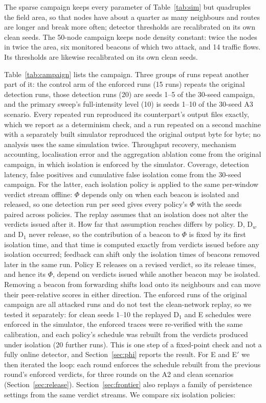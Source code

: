 The sparse campaign keeps every parameter of Table~\ref{tab:sim} but
quadruples the field area, so that nodes have about a quarter as many
neighbours and routes are longer and break more often; detector thresholds
are recalibrated on its own clean seeds. The 50-node campaign keeps node
density constant: twice the nodes in twice the area, six monitored beacons of
which two attack, and 14 traffic flows. Its thresholds are likewise
recalibrated on its own clean seeds.

Table~\ref{tab:campaign} lists the campaign. Three groups of runs repeat
another part of it: the control arm of the enforced runs (15 runs) repeats the
original detection runs, those detection runs (20) are seeds 1--5 of the
30-seed campaign, and the primary sweep's full-intensity level (10) is seeds
1--10 of the 30-seed A3 scenario. Every repeated run reproduced its
counterpart's output files exactly, which we report as a determinism check,
and a run repeated on a second machine with a separately built simulator
reproduced the original output byte for byte;
no analysis uses the same simulation twice. Throughput recovery, mechanism
accounting, localisation error and the aggregation ablation come from the
original campaign, in which isolation is enforced by the simulator. Coverage,
detection latency, false positives and cumulative false isolation come from
the 30-seed campaign. For the latter, each isolation policy is applied to the
same per-window verdict stream offline: $\Phi$ depends only on when each beacon
is isolated and released, so one detection run per seed gives every policy's
$\Phi$ with the seeds paired across policies. The replay assumes that an
isolation does not alter the verdicts issued after it. How far that assumption
reaches differs by policy. D, D$_w$ and D$_1$ never release, so the
contribution of a beacon to $\Phi$ is fixed by its first isolation time, and
that time is computed exactly from verdicts issued before any isolation
occurred; feedback can shift only the isolation times of beacons removed
later in the same run. Policy E releases on a revised verdict, so its release
times, and hence its $\Phi$, depend on verdicts issued while another beacon may
be isolated. Removing a beacon from forwarding shifts load onto its neighbours
and can move their peer-relative scores in either direction. The enforced
runs of the original campaign are all attacked runs and do not test the
clean-network replay, so we tested it separately: for clean seeds 1--10 the
replayed D$_1$ and E schedules were enforced in the simulator, the enforced
traces were re-verified with the same calibration, and each policy's schedule
was rebuilt from the verdicts produced under isolation (20 further runs).
This is one step of a fixed-point check and not a fully online detector,
and Section~\ref{sec:phi} reports the result. For E and E$'$ we then iterated
the loop: each round enforces the schedule rebuilt from the previous round's
enforced verdicts, for three rounds on the A2 and clean scenarios
(Section~\ref{sec:release}). Section~\ref{sec:frontier} also replays a
family of persistence settings from the same verdict streams. We compare six
isolation policies:

